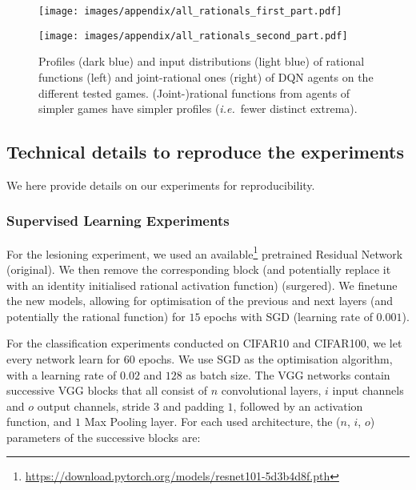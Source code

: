 \documentclass[accepted]{article}
\theoremstyle{plain}
\theoremstyle{definition}
\theoremstyle{remark}
\newcommand{\ie}{\emph{i.e.}~}
\begin{document}
\begin{figure}[H]
\centering
\texttt{[image: images/appendix/all\_rationals\_first\_part.pdf]} \end{figure}

\begin{figure}[H]
\centering
\texttt{[image: images/appendix/all\_rationals\_second\_part.pdf]}
\caption{Profiles (dark blue) and input distributions (light blue) of rational functions (left) and joint-rational ones (right) of DQN agents on the different tested games. (Joint-)rational functions from agents of simpler games have simpler profiles (\ie fewer distinct extrema).}
\label{fig:act_func_shapes}
\end{figure}









\subsection{Technical details to reproduce the experiments}
\label{app:experiments_details}
We here provide details on our experiments for reproducibility.
\subsubsection{Supervised Learning Experiments}
\label{app:details_sl}
For the lesioning experiment, we used an available\footnote{\url{https://download.pytorch.org/models/resnet101-5d3b4d8f.pth}} pretrained Residual Network (original). We then remove the corresponding block (and potentially replace it with an identity initialised rational activation function) (surgered). We finetune the new models, allowing for optimisation of the previous and next layers (and potentially the rational function) for $15$ epochs with SGD (learning rate of $0.001$).

For the classification experiments conducted on CIFAR10 and CIFAR100, we let every network learn for $60$ epochs. We use SGD as the optimisation algorithm, with a learning rate of $0.02$ and $128$ as batch size. The VGG networks contain successive VGG blocks that all consist of $n$ convolutional layers, $i$ input channels and $o$ output channels, stride $3$ and padding $1$, followed by an activation function, and $1$ Max Pooling layer. For each used architecture, the ($n$, $i$, $o$) parameters of the successive blocks are:
\end{document}
